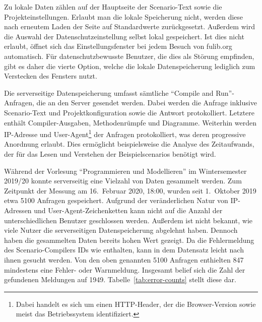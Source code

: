 Zu lokale Daten zählen auf der Hauptseite der Scenario-Text sowie die Projekteinstellungen.
Erlaubt man die lokale Speicherung nicht, werden diese nach erneutem Laden der Seite auf Standardwerte zurückgesetzt.
Außerdem wird die Auswahl der Datenschutzeinstellung selbst lokal gespeichert.
Ist dies nicht erlaubt, öffnet sich das Einstellungsfenster bei jedem Besuch von fulib.org automatisch.
Für datenschutzbewusste Benutzer, die dies als Störung empfinden, gibt es daher die vierte Option, welche die lokale Datenspeicherung lediglich zum Verstecken des Fensters nutzt.

Die serverseitige Datenspeicherung umfasst sämtliche ``Compile and Run''-Anfragen, die an den Server gesendet werden.
Dabei werden die Anfrage inklusive Scenario-Text und Projektkonfiguration sowie die Antwort protokolliert.
Letztere enthält Compiler-Ausgaben, Methodenrümpfe und Diagramme.
Weiterhin werden IP-Adresse und User-Agent\footnote{Dabei handelt es sich um einen HTTP-Header, der die Browser-Version sowie meist das Betriebssystem identifiziert.} der Anfragen protokolliert, was deren progressive Anordnung erlaubt.
Dies ermöglicht beispielsweise die Analyse des Zeitaufwands, der für das Lesen und Verstehen der Beispielscenarios benötigt wird.

Während der Vorlesung ``Programmieren und Modellieren'' im Wintersemester 2019/20 konnte serverseitig eine Vielzahl von Daten gesammelt werden.
Zum Zeitpunkt der Messung am 16.\ Februar 2020, 18:00, wurden seit 1.\ Oktober 2019 etwa 5100 Anfragen gespeichert.
Aufgrund der veränderlichen Natur von IP-Adressen und User-Agent-Zeichenketten kann nicht auf die Anzahl der unterschiedlichen Benutzer geschlossen werden.
Außerdem ist nicht bekannt, wie viele Nutzer die serverseitigen Datenspeicherung abgelehnt haben.
Dennoch haben die gesammelten Daten bereits hohen Wert gezeigt.
Da die Fehlermeldung des Scenario-Compilers IDs wie  enthalten, kann in dem Datensatz leicht nach ihnen gesucht werden.
Von den oben genannten 5100 Anfragen enthielten 847 mindestens eine Fehler- oder Warnmeldung.
Insgesamt belief sich die Zahl der gefundenen Meldungen auf 1949.
Tabelle~\ref{tab:error-counts} stellt diese dar.

